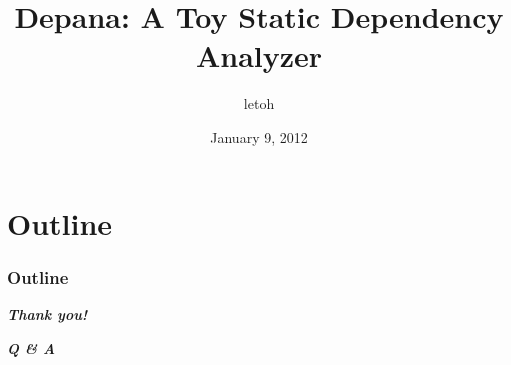\documentclass[14pt]{beamer}
\title{Depana: A Toy Static Dependency Analyzer}
\author{letoh}
\institute{PyHug::January}
\date{January 9, 2012}
\newcommand{\alertframe}[1]{
	\begin{frame}
		\begin{center}
			\alert{\textbf{\Huge #1}}
		\end{center}
	\end{frame}
}
\begin{document}
\begin{CJK}{UTF8}{nsung}




%
%
\begin{frame}
  \titlepage
\end{frame}


%
%
\section*{Outline} 
\begin{frame}
  \frametitle{Outline}
  \tableofcontents
\end{frame}





\alertframe{\textit{Thank you!}}
\alertframe{\textit{Q \& A}}



\end{CJK}
\end{document}
